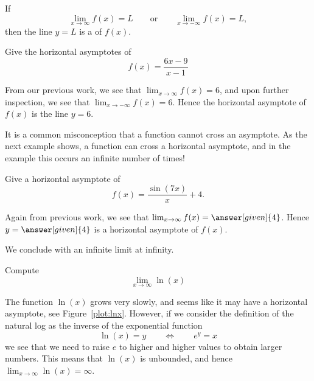 \documentclass{ximera}
\begin{document}
\begin{definition}\label{def:horiz asymptote}
If  
\[
\lim_{x\to \infty} f(x) = L \qquad\text{or}\qquad \lim_{x\to -\infty} f(x) = L,
\]
then the line $y=L$ is a  of $f(x)$.
\end{definition}

\begin{example} 
Give the horizontal asymptotes of
\[
f(x) = \frac{6x-9}{x-1}
\]
\begin{explanation}
From our previous work, we see that $\lim_{x\to \infty} f(x) = 6$, and
upon further inspection, we see that $\lim_{x\to -\infty} f(x) =
6$. Hence the horizontal asymptote of $f(x)$ is the line $y=6$.
\end{explanation}
\end{example}


It is a common misconception that a function cannot cross an
asymptote. As the next example shows, a function can cross a horizontal
asymptote, and in the example this occurs an infinite number of times!

\begin{example}
Give a horizontal asymptote of
\[
f(x) = \frac{\sin(7x)}{x}+4.
\]
\begin{explanation}
Again from previous work, we see that $\lim_{x\to \infty} f(x) =
\answer[given]{4}$. Hence $y=\answer[given]{4}$ is a horizontal asymptote of $f(x)$.
\end{explanation}
\end{example}


We conclude with an infinite limit at infinity.

\begin{example}
Compute
\[
\lim_{x\to \infty} \ln(x)
\]
\begin{image}
\end{image}
\begin{explanation}
The function $\ln(x)$ grows very slowly, and seems like it may have a
horizontal asymptote, see Figure~\ref{plot:lnx}. However, if we
consider the definition of the natural log as the inverse of the exponential function
\[
\ln(x) = y \qquad \Leftrightarrow\qquad e^y =x
\]
we see that we need to raise $e$ to higher and higher values to obtain
larger numbers.  This means that $\ln(x)$ is unbounded, and hence
$\lim_{x\to\infty}\ln(x)=\infty$.
\end{explanation}
\end{example}
\end{document}
